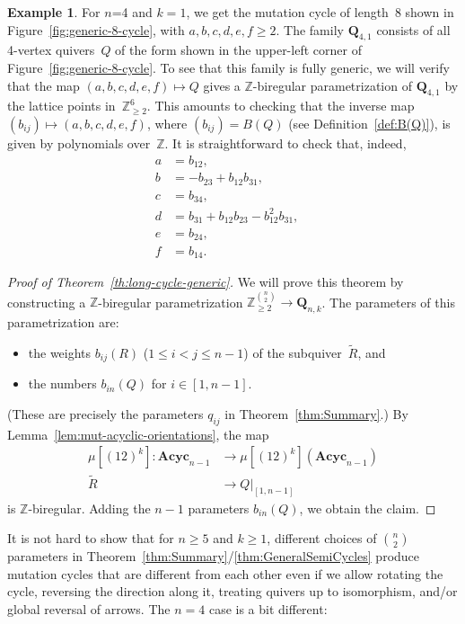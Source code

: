 \documentclass[11pt, letterpaper]{amsart}
\theoremstyle{definition}
\newtheorem{example}[theorem]{Example}
\numberwithin{equation}{section}
\def\ZZ{{\mathbb Z}}
\begin{document}
\begin{example}
For $n$=4 and $k=1$, we get the mutation cycle of length~8 shown in 
Figure~\ref{fig:generic-8-cycle}, with $a,b,c,d,e,f\ge2$.
The family $\mathbf{Q}_{4,1}$ consists of all 4-vertex quivers~$Q$ of the form 
shown in the upper-left corner of Figure~\ref{fig:generic-8-cycle}. 
To see that this family is fully generic, we will verify that the map $(a,b,c,d,e,f)\mapsto Q$ 
gives a $\ZZ$-biregular parametrization of $\mathbf{Q}_{4,1}$ by the lattice points in~$\ZZ_{\ge2}^6$. 
This amounts to checking that the inverse map $(b_{ij})\mapsto (a,b,c,d,e,f)$,
where $(b_{ij})=B(Q)$ (see Definition~\ref{def:B(Q)}), is given by polynomials over~$\ZZ$. 
It is straightforward to check that, indeed,
\begin{align*}
a&=b_{12}, \quad \\
b&=-b_{23}+b_{12}b_{31}, \quad \\
c&=b_{34},\quad \\
d&=b_{31}+b_{12}b_{23}-b_{12}^2b_{31}, \quad \\
e&=b_{24}, \quad \\
f&=b_{14}. 
\end{align*}
\end{example}

\begin{proof}[Proof of Theorem~\ref{th:long-cycle-generic}]
We will prove this theorem by constructing a $\ZZ$-biregular parametrization 
$\ZZ_{\ge2}^{\binom{n}{2}} \to \mathbf{Q}_{n,k}$. 
The parameters of this parametrization are: 
\begin{itemize}[leftmargin=.2in]
\item 
the weights $b_{ij}(R)$ ($1\le i< j\le n-1$) of the subquiver~$\tilde R$, and 
\item
the numbers $b_{in}(Q)$ for $i\in [1,n-1]$. 
\end{itemize}
(These are precisely the parameters $q_{ij}$ in Theorem~\ref{thm:Summary}.)
By Lemma~\ref{lem:mut-acyclic-orientations}, the map 
\begin{align*}
\mu[(12)^k]: \mathbf{Acyc}_{n-1} &\longrightarrow \mu[(12)^k](\mathbf{Acyc}_{n-1}) \\
\tilde R &\longrightarrow Q|_{[1,n-1]}
\end{align*}
is $\ZZ$-biregular. 
Adding the $n-1$ parameters $b_{in}(Q)$, we obtain the claim. 
\end{proof}

\pagebreak[3]

It is not hard to show that for $n\ge5$ and $k\ge1$, 
different choices of $\binom{n}{2}$ parameters in Theorem~\ref{thm:Summary}/\ref{thm:GeneralSemiCycles} 
produce mutation cycles that are different 
from each other even if we allow rotating the cycle, reversing the direction along it, 
treating quivers up to isomorphism, and/or global reversal of arrows. 
The $n=4$ case is a bit different: 
\end{document}
